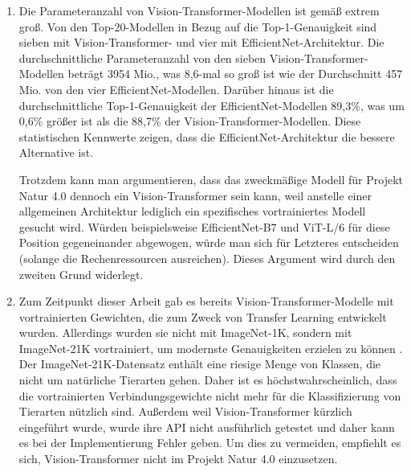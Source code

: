 \begin{enumerate}
	\item Die Parameteranzahl von Vision-Transformer-Modellen ist gemäß \cite{PapersWithCode-ImageNet} extrem groß. Von den Top-20-Modellen in Bezug auf die Top-1-Genauigkeit sind sieben mit Vision-Transformer- und vier mit EfficientNet-Architektur. Die durchschnittliche Parameteranzahl von den sieben Vision-Transformer-Modellen beträgt 3954 Mio., was 8,6-mal so groß ist wie der Durchschnitt 457 Mio. von den vier EfficientNet-Modellen. Darüber hinaus ist die durchschnittliche Top-1-Genauigkeit der EfficientNet-Modellen 89,3\%, was um 0,6\% größer ist als die 88,7\% der Vision-Transformer-Modellen. Diese statistischen Kennwerte zeigen, dass die EfficientNet-Architektur die bessere Alternative ist.
	
	Trotzdem kann man argumentieren, dass das zweckmäßige Modell für Projekt Natur 4.0 dennoch ein Vision-Transformer sein kann, weil anstelle einer allgemeinen Architektur lediglich ein spezifisches vortrainiertes Modell gesucht wird. Würden beispielsweise EfficientNet-B7 und ViT-L/6 für diese Position gegeneinander abgewogen, würde man sich für Letzteres entscheiden (solange die Rechenressourcen ausreichen). Dieses Argument wird durch den zweiten Grund widerlegt.
	
	\item Zum Zeitpunkt dieser Arbeit gab es bereits Vision-Transformer-Modelle mit vortrainierten Gewichten, die zum Zweck von Transfer Learning entwickelt wurden. Allerdings wurden sie nicht mit ImageNet-1K, sondern mit ImageNet-21K vortrainiert, um modernste Genauigkeiten erzielen zu können \cite[6]{dosovitskiy2021image}. Der ImageNet-21K-Datensatz enthält eine riesige Menge von Klassen, die nicht um natürliche Tierarten gehen. Daher ist es höchstwahrscheinlich, dass die vortrainierten Verbindungsgewichte nicht mehr für die Klassifizierung von Tierarten nützlich sind. Außerdem weil Vision-Transformer kürzlich eingeführt wurde, wurde ihre API nicht ausführlich getestet und daher kann es bei der Implementierung Fehler geben. Um dies zu vermeiden, empfiehlt es sich, Vision-Transformer nicht im Projekt Natur 4.0 einzusetzen.
\end{enumerate}

